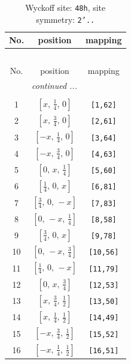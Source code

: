 \documentclass[fleqn,8pt]{jsarticle}
\begin{document}
\begin{longtable}{ccc}
\caption{Wyckoff site: {\tt 48h}, site symmetry: {\tt 2'..}}
 \\
 \hline \hline
No. & position & mapping \\ \hline \endfirsthead

\multicolumn{2}{l}{\tablename\ \thetable{}} \\
 \hline \hline
No. & position & mapping \\ \hline \endhead

 \hline \hline
\multicolumn{2}{r}{\footnotesize\it continued ...} \\ \endfoot

 \hline \hline
\multicolumn{2}{r}{} \\ \endlastfoot

1 & $\left[ x,\, \frac{1}{4},\, 0 \right]$ & {\tt [1,62]} \\ \hline
2 & $\left[ x,\, \frac{3}{4},\, 0 \right]$ & {\tt [2,61]} \\ \hline
3 & $\left[ - x,\, \frac{1}{4},\, 0 \right]$ & {\tt [3,64]} \\ \hline
4 & $\left[ - x,\, \frac{3}{4},\, 0 \right]$ & {\tt [4,63]} \\ \hline
5 & $\left[ 0,\, x,\, \frac{1}{4} \right]$ & {\tt [5,60]} \\ \hline
6 & $\left[ \frac{1}{4},\, 0,\, x \right]$ & {\tt [6,81]} \\ \hline
7 & $\left[ \frac{3}{4},\, 0,\, - x \right]$ & {\tt [7,83]} \\ \hline
8 & $\left[ 0,\, - x,\, \frac{1}{4} \right]$ & {\tt [8,58]} \\ \hline
9 & $\left[ \frac{3}{4},\, 0,\, x \right]$ & {\tt [9,78]} \\ \hline
10 & $\left[ 0,\, - x,\, \frac{3}{4} \right]$ & {\tt [10,56]} \\ \hline
11 & $\left[ \frac{1}{4},\, 0,\, - x \right]$ & {\tt [11,79]} \\ \hline
12 & $\left[ 0,\, x,\, \frac{3}{4} \right]$ & {\tt [12,53]} \\ \hline
13 & $\left[ x,\, \frac{3}{4},\, \frac{1}{2} \right]$ & {\tt [13,50]} \\ \hline
14 & $\left[ x,\, \frac{1}{4},\, \frac{1}{2} \right]$ & {\tt [14,49]} \\ \hline
15 & $\left[ - x,\, \frac{3}{4},\, \frac{1}{2} \right]$ & {\tt [15,52]} \\ \hline
16 & $\left[ - x,\, \frac{1}{4},\, \frac{1}{2} \right]$ & {\tt [16,51]} \\ \hline

\end{longtable}
\end{document}
